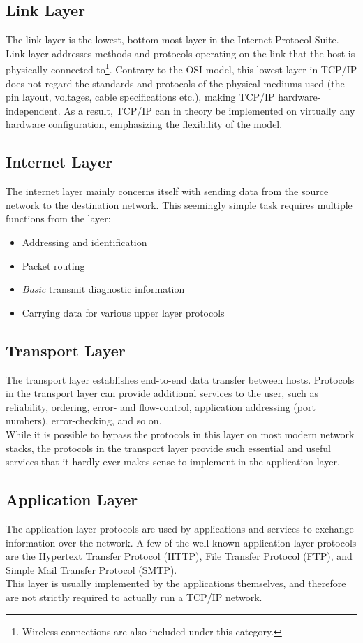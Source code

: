 \subsection{Link Layer}
The link layer is the lowest, bottom-most layer in the Internet Protocol Suite.
Link layer addresses methods and protocols operating on the link that the host
is physically connected to\footnote{Wireless connections are also included
under this category.}. Contrary to the OSI model, this lowest layer in TCP/IP
does not regard the standards and protocols of the physical mediums used (the
pin layout, voltages, cable specifications etc.), making TCP/IP hardware-independent.
As a result, TCP/IP can in theory be implemented on virtually any hardware
configuration, emphasizing the flexibility of the model.

\subsection{Internet Layer}
The internet layer mainly concerns itself with sending data from the source
network to the destination network. This seemingly simple task requires multiple
functions from the layer:
\begin{itemize}
    \item Addressing and identification
    \item Packet routing
    \item \emph{Basic} transmit diagnostic information
    \item Carrying data for various upper layer protocols
\end{itemize}

\subsection{Transport Layer}
The transport layer establishes end-to-end data transfer between hosts.
Protocols in the transport layer can provide additional services to the user,
such as reliability, ordering, error- and flow-control, application addressing
(port numbers), error-checking, and so on.\\
While it is possible to bypass the protocols in this layer on most modern
network stacks, the protocols in the transport layer provide such essential
and useful services that it hardly ever makes sense to implement in the
application layer.


\subsection{Application Layer}
The application layer protocols are used by applications and services to
exchange information over the network. A few of the well-known application
layer protocols are the Hypertext Transfer Protocol (HTTP)\cite{RFC1945},
File Transfer Protocol (FTP)\cite{RFC0114}, and Simple Mail Transfer Protocol
(SMTP)\cite{RFC0788}.\\
This layer is usually implemented by the applications themselves, and therefore
are not strictly required to actually run a TCP/IP network.




